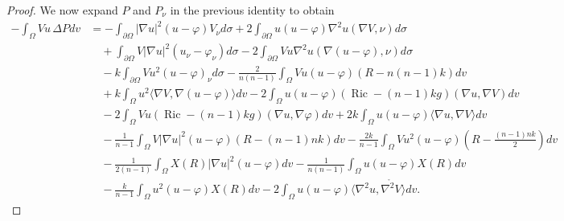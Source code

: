 \documentclass[10pt,a4paper]{amsart}
\begin{document}
\begin{proof}
We now expand \(P\) and \(P_{\nu}\) in the previous identity to obtain
\begin{align}\label{eq412}
-\int_{\Omega}Vu\,\Delta P dv
&=
-\int_{\partial\Omega}|\nabla u|^{2}(u-\varphi)V_{\nu} d\sigma
+2\int_{\partial\Omega}u(u-\varphi)\nabla^{2}u(\nabla V,\nu) d\sigma
\nonumber\\
&\quad
+\int_{\partial\Omega}V|\nabla u|^{2}(u_{\nu}-\varphi_{\nu}) d\sigma
-2\int_{\partial\Omega}Vu\nabla^{2}u(\nabla(u-\varphi),\nu) d\sigma
\nonumber\\
&\quad
-k\int_{\partial\Omega}Vu^{2}(u-\varphi)_{\nu} d\sigma
-\frac{2}{n(n-1)}
\int_{\Omega}Vu(u-\varphi)(R-n(n-1)k)dv
\nonumber\\
&\quad
+k\int_{\Omega}u^{2}\langle\nabla V,\nabla(u-\varphi)\rangle dv
-2\int_{\Omega}u(u-\varphi)(\operatorname{Ric}-(n-1)kg)(\nabla u,\nabla V)dv
\nonumber\\
&\quad
-2\int_{\Omega}Vu(\operatorname{Ric}-(n-1)kg)(\nabla u,\nabla\varphi) dv
+2k\int_{\Omega}u(u-\varphi)\langle\nabla u,\nabla V\rangle dv
\nonumber\\
&\quad
-\frac{1}{n-1}
\int_{\Omega}V|\nabla u|^{2}(u-\varphi)(R-(n-1)nk) dv
-\frac{2k}{n-1}
\int_{\Omega}Vu^{2}(u-\varphi)
\left(R-\frac{(n-1)nk}{2}\right) dv
\nonumber\\
&\quad
-\frac{1}{2(n-1)}
\int_{\Omega}X(R)|\nabla u|^{2}(u-\varphi)dv
-\frac{1}{n(n-1)}
\int_{\Omega}u(u-\varphi)X(R)dv
\nonumber\\
&\quad
-\frac{k}{n-1}
\int_{\Omega}u^{2}(u-\varphi)X(R)dv
-2\int_{\Omega}u(u-\varphi)
\langle\nabla^{2}u,\mathring{\nabla^{2}V}\rangle dv.
\end{align}


\end{proof}
\end{document}
